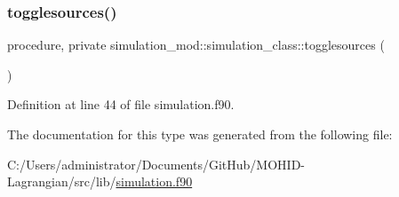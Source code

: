 \subsubsection{\texorpdfstring{togglesources()}{togglesources()}}
{\footnotesize\ttfamily procedure, private simulation\+\_\+mod\+::simulation\+\_\+class\+::togglesources (\begin{DoxyParamCaption}{ }\end{DoxyParamCaption})\hspace{0.3cm}{\ttfamily [private]}}



Definition at line 44 of file simulation.\+f90.



The documentation for this type was generated from the following file\+:\begin{DoxyCompactItemize}
\item 
C\+:/\+Users/administrator/\+Documents/\+Git\+Hub/\+M\+O\+H\+I\+D-\/\+Lagrangian/src/lib/\mbox{\hyperlink{simulation_8f90}{simulation.\+f90}}\end{DoxyCompactItemize}
